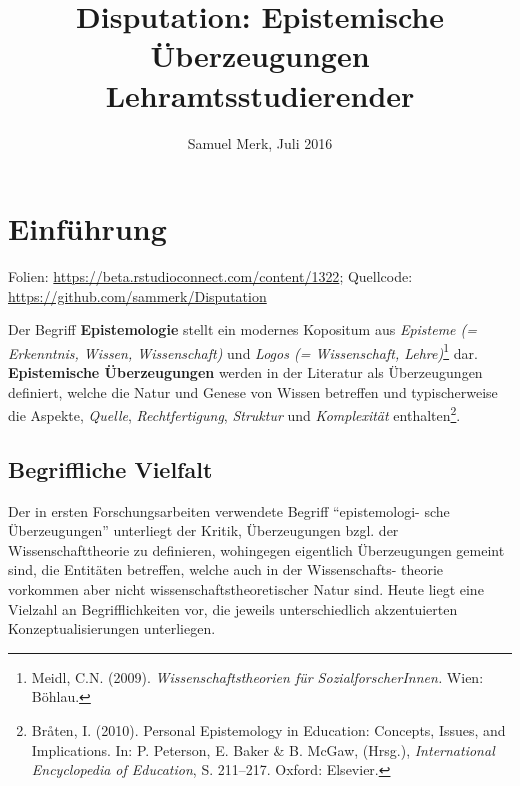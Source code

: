 \documentclass[]{tufte-handout}
\title{Disputation: Epistemische Überzeugungen \mbox{Lehramtsstudierender}}
\date{Samuel Merk, Juli 2016}
\begin{document}
\maketitle




\section{Einführung}\label{einfuhrung}

\begin{marginfigure}
Folien: \url{https://beta.rstudioconnect.com/content/1322}; Quellcode:
\url{https://github.com/sammerk/Disputation}
\end{marginfigure}

Der Begriff \textbf{Epistemologie} stellt ein modernes Kopositum aus
\emph{Episteme (= Erkenntnis, Wissen, Wissenschaft)} und \emph{Logos (=
Wissenschaft, Lehre)}\footnote{Meidl, C.N. (2009).
  \emph{Wissenschaftstheorien für SozialforscherInnen.} Wien: Böhlau.}
dar. \textbf{Epistemische Überzeugungen} werden in der Literatur als
Überzeugungen definiert, welche die Natur und Genese von Wissen
betreffen und typischerweise die Aspekte, \emph{Quelle},
\emph{Rechtfertigung}, \emph{Struktur} und \emph{Komplexität}
enthalten\footnote{Bråten, I. (2010). Personal Epistemology in
  Education: Concepts, Issues, and Implications. In: P. Peterson, E.
  Baker \& B. McGaw, (Hrsg.), \emph{International Encyclopedia of
  Education}, S. 211--217. Oxford: Elsevier.}.

\subsection{Begriffliche Vielfalt}\label{begriffliche-vielfalt}

Der in ersten Forschungsarbeiten verwendete Begriff ``epistemologi- sche
Überzeugungen'' unterliegt der Kritik, Überzeugungen bzgl. der
Wissenschafttheorie zu definieren, wohingegen eigentlich Überzeugungen
gemeint sind, die Entitäten betreffen, welche auch in der
Wissenschafts- theorie vorkommen aber nicht wissenschaftstheoretischer
Natur sind. Heute liegt eine Vielzahl an Begrifflichkeiten vor, die
jeweils unterschiedlich akzentuierten Konzeptualisierungen unterliegen.
\end{document}
